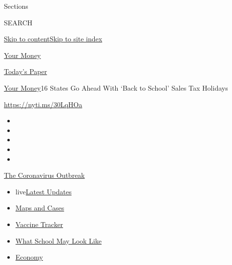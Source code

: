 Sections

SEARCH

\protect\hyperlink{site-content}{Skip to
content}\protect\hyperlink{site-index}{Skip to site index}

\href{https://www.nytimes.com/section/your-money}{Your Money}

\href{https://myaccount.nytimes.com/auth/login?response_type=cookie\&client_id=vi}{}

\href{https://www.nytimes.com/section/todayspaper}{Today's Paper}

\href{/section/your-money}{Your Money}\textbar{}16 States Go Ahead With
`Back to School' Sales Tax Holidays

\url{https://nyti.ms/30LqHOa}

\begin{itemize}
\item
\item
\item
\item
\item
\end{itemize}

\href{https://www.nytimes.com/news-event/coronavirus?action=click\&pgtype=Article\&state=default\&region=TOP_BANNER\&context=storylines_menu}{The
Coronavirus Outbreak}

\begin{itemize}
\tightlist
\item
  live\href{https://www.nytimes.com/2020/08/01/world/coronavirus-covid-19.html?action=click\&pgtype=Article\&state=default\&region=TOP_BANNER\&context=storylines_menu}{Latest
  Updates}
\item
  \href{https://www.nytimes.com/interactive/2020/us/coronavirus-us-cases.html?action=click\&pgtype=Article\&state=default\&region=TOP_BANNER\&context=storylines_menu}{Maps
  and Cases}
\item
  \href{https://www.nytimes.com/interactive/2020/science/coronavirus-vaccine-tracker.html?action=click\&pgtype=Article\&state=default\&region=TOP_BANNER\&context=storylines_menu}{Vaccine
  Tracker}
\item
  \href{https://www.nytimes.com/interactive/2020/07/29/us/schools-reopening-coronavirus.html?action=click\&pgtype=Article\&state=default\&region=TOP_BANNER\&context=storylines_menu}{What
  School May Look Like}
\item
  \href{https://www.nytimes.com/live/2020/07/31/business/stock-market-today-coronavirus?action=click\&pgtype=Article\&state=default\&region=TOP_BANNER\&context=storylines_menu}{Economy}
\end{itemize}

